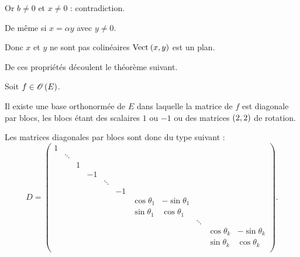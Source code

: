 \begin{dem}
Or \(b\not=0\) et \(x\not=0\) : contradiction.

De même si \(x=\alpha y\) avec \(y\not=0\).

Donc \(x\) et \(y\) ne sont pas colinéaires \ie \(\Vect{x,y}\) est un plan.
\end{dem}

De ces propriétés découlent le théorème suivant.

\begin{theo}
Soit \(f\in\Orth{}[E]\).

Il existe une base orthonormée de \(E\) dans laquelle la matrice de \(f\) est diagonale par blocs, les blocs étant des scalaires \(1\) ou \(-1\) ou des matrices \(\left(2,2\right)\) de rotation.
\end{theo}

Les matrices diagonales par blocs sont donc du type suivant : \[D=\begin{pmatrix}
1 &  &  &  &  &  &  &  &  &  &  \\
& \ddots &  &  &  &  &  &  &  &  &  \\
&  & 1 &  &  &  &  &  &  &  &  \\
&  &  & -1 &  &  &  &  &  &  &  \\
&  &  &  & \ddots &  &  &  &  &  &  \\
&  &  &  &  & -1 &  &  &  &  &  \\
&  &  &  &  &  & \cos\theta_1 & -\sin\theta_1 &  &  &  \\
&  &  &  &  &  & \sin\theta_1 & \cos\theta_1 &  &  &  \\
&  &  &  &  &  &  &  & \ddots &  &  \\
&  &  &  &  &  &  &  &  & \cos\theta_k & -\sin\theta_k \\
&  &  &  &  &  &  &  &  & \sin\theta_k & \cos\theta_k \\
\end{pmatrix}.\]

